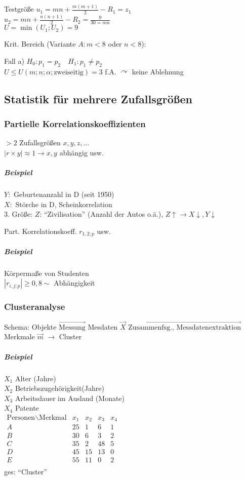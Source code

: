 \documentclass[a4paper]{scrartcl}
\begin{document}
Testgröße $u_1 = mn + \frac{m(m+1)}{2} - R_1 = z_1$\\
$u_2 = mn + \frac{n(n+1)}{2} - R_2 = \frac{9}{30 = mn}$\\
$U = \min (U_1;U_2) = 9$

Krit. Bereich (Variante $A: m < 8$ oder $ n <8$):

Fall a) $H_0 : p_1 = p_2 \quad H_1 : p_1 \neq p_2$\\
$U \leq U (m;n;\alpha;\text{zweiseitig}) = 3$ f.A. $\curvearrowright$ keine Ablehnung

\subsection{Statistik für mehrere Zufallsgrößen}%
\subsubsection{Partielle Korrelationskoeffizienten}%
$>2$ Zufallsgrößen $x,y,z,\dots$\\
$| r \times y | \approx 1 \rightarrow x,y $ abhängig usw.\\
\subparagraph{Beispiel} $Y:$ Geburtenanzahl in D (seit 1950)\\
$X:$ Störche in D, Scheinkorrelation\\
3. Größe: $Z$: "`Zivilisation"' (Anzahl der Autos o.ä.), $Z\uparrow \rightarrow X\downarrow , Y\downarrow$

Part. Korrelationskoeff. $r_{1,2;p}$ usw.
\subparagraph{Beispiel} Körpermaße von Studenten\\
$| r_{i,j;p} | \geq 0,8 \sim$ Abhängigkeit

\subsubsection{Clusteranalyse}
Schema: Objekte $\overrightarrow{\text{Messung}}$ Mesdaten $\vec{X}$ $\overrightarrow{\text{Zusammenfsg., Messdatenextraktion}}$ Merkmale $\vec{m}$ $\rightarrow$ Cluster

\subparagraph{Beispiel}
$X_1$ Alter (Jahre)\\
$X_2$ Betriebszugehörigkeit(Jahre)\\
$X_3$ Arbeitsdauer im Ausland (Monate)\\
$X_4$ Patente\\
$\begin{array}{c|cccc}
\text{Personen} \backslash \text{Merkmal} & x_1 & x_2& x_3 & x_4\\ \hline
A & 25 & 1 & 6 &1 \\
B & 30 & 6 & 3 &2\\
C & 35 & 2 & 48 & 5\\
D & 45 & 15 & 13 & 0\\
E & 55 & 11 & 0 & 2\\
\end{array}$\\
ges: "`Cluster"'
\end{document}

